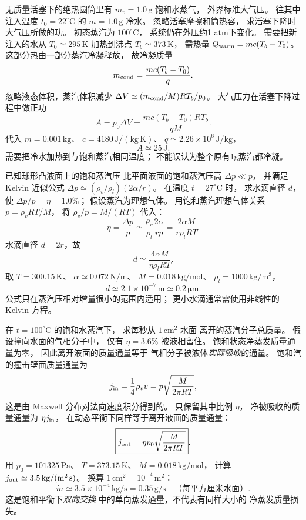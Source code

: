 无质量活塞下的绝热圆筒里有
$m_v=1.0\,\mathrm g$ 饱和水蒸气，
外界标准大气压。
往其中注入温度
$t_0=22^\circ\mathrm C$ 的
$m=1.0\,\mathrm g$ 冷水。
忽略活塞摩擦和筒热容，
求活塞下降时大气压所做的功。
\exsolution
初态蒸汽为 $100^\circ\mathrm C$，
系统仍在外压约1 atm下变化。
需要把新注入的水从
$T_0\simeq295\,\mathrm K$
加热到沸点
$T_b\simeq373\,\mathrm K$，
需热量
$Q_{\rm warm}=mc(T_b-T_0)$。
这部分热由一部分蒸汽冷凝释放，
故冷凝质量
\[
m_{\rm cond}=\frac{mc(T_b-T_0)}q.
\]
忽略液态体积，蒸汽体积减少
$\Delta V\simeq
(m_{\rm cond}/M)RT_b/p_0$。
大气压力在活塞下降过程中做正功
\[
\boxed{A=p_0\Delta V=
\frac{mc(T_b-T_0)RT_b}{qM}}.
\]
代入
$m=0.001\,\mathrm{kg}$、
$c=4180\,\mathrm{J/(kg\,K)}$、
$q\simeq2.26\times10^6\,\mathrm{J/kg}$，
\[
\boxed{A\simeq25\,\mathrm J}.
\]
\excheck 需要把冷水加热到与饱和蒸汽相同温度；
不能误认为整个原有1g蒸汽都冷凝。

已知球形凸液面上的饱和蒸汽压
比平面液面的饱和蒸汽压高
$\Delta p\ll p$，
并满足 Kelvin 近似公式
$\Delta p\simeq(\rho_v/\rho_l)(2\alpha/r)$。
在温度 $t=27^\circ\mathrm C$ 时，
求水滴直径 $d$，使
$\Delta p/p=\eta=1.0\%$；
假设蒸汽为理想气体。
\exsolution
用饱和蒸汽理想气体关系
$p=\rho_vRT/M$，
将 $\rho_v/p=M/(RT)$ 代入：
\[
\eta=\frac{\Delta p}{p}
\simeq\frac{\rho_v}{\rho_l}
\frac{2\alpha}{rp}
=\frac{2\alpha M}{r\rho_lRT}.
\]
水滴直径 $d=2r$，故
\[
\boxed{d\simeq
\frac{4\alpha M}{\eta\rho_lRT}}.
\]
取 $T=300.15\,\mathrm K$、
$\alpha\simeq0.072\,\mathrm{N/m}$、
$M=0.018\,\mathrm{kg/mol}$、
$\rho_l=1000\,\mathrm{kg/m^3}$，
\[
\boxed{d\simeq2.1\times10^{-7}\,\mathrm m
\simeq0.2\,\mathrm{\mu m}}.
\]
\excheck 公式只在蒸汽压相对增量很小的范围内适用；
更小水滴通常需使用非线性的 Kelvin 方程。

在 $t=100^\circ\mathrm C$ 的饱和水蒸汽下，
求每秒从 $1\,\mathrm{cm^2}$ 水面
离开的蒸汽分子总质量。
假设撞向水面的气相分子中，
仅有 $\eta=3.6\%$ 被液相留住。
\exsolution
饱和状态净蒸发质量通量为零，
因此离开液面的质量通量等于
气相分子被液体\emph{实际吸收}的通量。
饱和汽的撞击壁面质量通量为
\[
j_{\rm in}=\frac14\rho_v\bar v
=p\sqrt{\frac{M}{2\pi RT}},
\]
这是由 Maxwell 分布对法向速度积分得到的。
只保留其中比例 $\eta$，
净被吸收的质量通量为 $\eta j_{\rm in}$，
在动态平衡下同样等于离开液面的质量通量：
\[
\boxed{j_{\rm out}=
\eta p_0\sqrt{\frac{M}{2\pi RT}}}.
\]
用
$p_0=101325\,\mathrm{Pa}$、
$T=373.15\,\mathrm K$、
$M=0.018\,\mathrm{kg/mol}$，
计算
$j_{\rm out}\simeq3.5\,\mathrm{kg/(m^2\,s)}$。
换算 $1\,\mathrm{cm^2}=10^{-4}\,\mathrm{m^2}$：
\[
\boxed{\dot m\simeq3.5\times10^{-4}\,\mathrm{kg/s}
=0.35\,\mathrm{g/s}}
\quad\text{（每平方厘米水面）}.
\]
\excheck 这是饱和平衡下\emph{双向交换}
中的单向蒸发通量，不代表有同样大小的
净蒸发质量损失。

